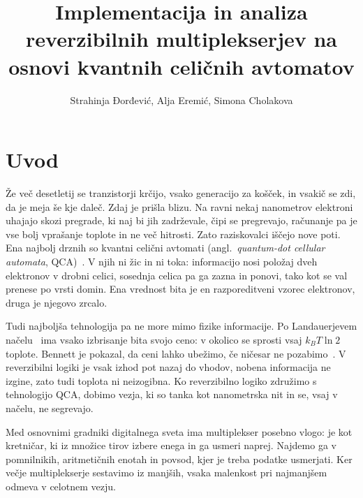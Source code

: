 \documentclass[graybox, envcountchap]{svmult}
\title{Implementacija in analiza reverzibilnih multiplekserjev na osnovi kvantnih celičnih avtomatov}
\author{Strahinja Ðorđević, Alja Eremić, Simona Cholakova}
\begin{document}
\maketitle


\section{Uvod}
\label{g25:sec:uvod}

Že več desetletij se tranzistorji krčijo, vsako generacijo za košček, in vsakič se zdi, da je meja še kje daleč. Zdaj je prišla blizu. Na ravni nekaj nanometrov elektroni uhajajo skozi pregrade, ki naj bi jih zadrževale, čipi se pregrevajo, računanje pa je vse bolj vprašanje toplote in ne več hitrosti. Zato raziskovalci iščejo nove poti. Ena najbolj drznih so kvantni celični avtomati (angl.~\emph{quantum-dot cellular automata}, QCA)~\cite{lent1993}. V njih ni žic in ni toka: informacijo nosi položaj dveh elektronov v drobni celici, sosednja celica pa ga zazna in ponovi, tako kot se val prenese po vrsti domin. Ena vrednost bita je en razporeditveni vzorec elektronov, druga je njegovo zrcalo.

Tudi najboljša tehnologija pa ne more mimo fizike informacije. Po Landauerjevem načelu~\cite{landauer1961} ima vsako izbrisanje bita svojo ceno: v okolico se sprosti vsaj $k_B T \ln 2$ toplote. Bennett je pokazal, da ceni lahko ubežimo, če ničesar ne pozabimo~\cite{bennett1973}. V reverzibilni logiki je vsak izhod pot nazaj do vhodov, nobena informacija ne izgine, zato tudi toplota ni neizogibna. Ko reverzibilno logiko združimo s tehnologijo QCA, dobimo vezja, ki so tanka kot nanometrska nit in se, vsaj v načelu, ne segrevajo.

Med osnovnimi gradniki digitalnega sveta ima multiplekser posebno vlogo: je kot kretničar, ki iz množice tirov izbere enega in ga usmeri naprej. Najdemo ga v pomnilnikih, aritmetičnih enotah in povsod, kjer je treba podatke usmerjati. Ker večje multiplekserje sestavimo iz manjših, vsaka malenkost pri najmanjšem odmeva v celotnem vezju.
\end{document}
